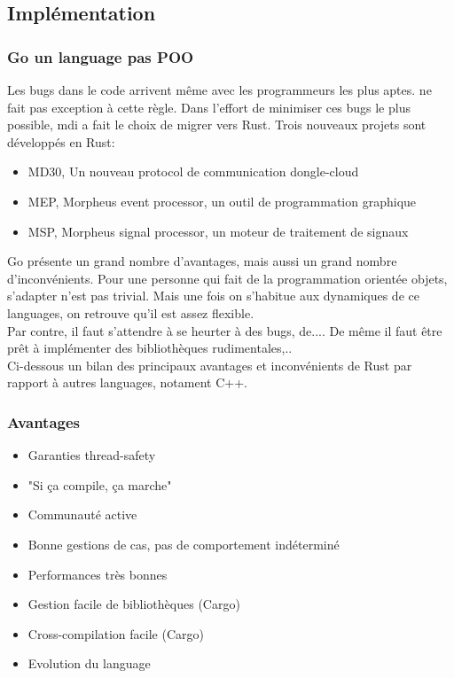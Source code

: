     \subsection{Implémentation}
        \subsubsection{Go un language pas POO}
        Les bugs dans le code arrivent même avec les programmeurs les plus aptes.
        \company{} ne fait pas exception à cette règle. Dans l'effort de minimiser
        ces bugs le plus possible, \gls{mdi} a fait le choix de migrer vers Rust.
        Trois nouveaux projets sont développés en Rust:
        \begin{itemize}
            \renewcommand{\labelitemi}{$\bullet$}
            \item MD30, Un nouveau protocol de communication dongle-cloud
            \item MEP, Morpheus event processor, un outil de programmation graphique
            \item MSP, Morpheus signal processor, un moteur de traitement de signaux
        \end{itemize}
        \bigskip
        Go présente un grand nombre d'avantages, mais aussi un grand nombre
        d'inconvénients. Pour une personne qui fait de la programmation orientée
        objets, s'adapter n'est pas trivial. Mais une fois on s'habitue aux
        dynamiques de ce languages, on retrouve qu'il est assez flexible.\\[0.3cm]
        Par contre, il faut s'attendre à se heurter à des bugs, de.... 
        De même il faut être prêt à implémenter des bibliothèques rudimentales,..\\[0.3cm]
        Ci-dessous un bilan des principaux avantages et inconvénients de Rust par
        rapport à autres languages, notament C++.

        \subsubsection{Avantages}
            \begin{itemize}
                \renewcommand{\labelitemi}{$\bullet$}
                \item Garanties thread-safety
                \item "Si \c ca compile, \c ca marche"
                \item Communauté active
                \item Bonne gestions de cas, pas de comportement indéterminé
                \item Performances très bonnes
                \item Gestion facile de bibliothèques (Cargo)
                \item Cross-compilation facile (Cargo)
                \item Evolution du language
            \end{itemize}

